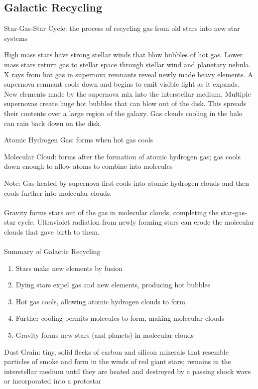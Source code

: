 \documentclass[12pt]{article}
\begin{document}
\subsection{Galactic Recycling}
\begin{definition} Star-Gas-Star Cycle: the process of recycling gas from old stars into new star systems
\end{definition}
High mass stars have strong stellar winds that blow bubbles of hot gas. Lower mass stars return gas to stellar space through stellar wind and planetary nebula. X rays from hot gas in supernova remnants reveal newly made heavy elements. A supernova remnant cools down and begins to emit visible light as it expands. New elements made by the supernova mix into the interstellar medium. Multiple supernovas create huge hot bubbles that can blow out of the disk. This spreads their contents over a large region of the galaxy. Gas clouds cooling in the halo can rain back down on the disk. 
\begin{definition} Atomic Hydrogen Gas: forms when hot gas cools \end{definition}
\begin{definition} Molecular Cloud: forms after the formation of atomic hydrogen gas; gas cools down enough to allow atoms to combine into molecules \end{definition}
Note: Gas heated by supernova first cools into atomic hydrogen clouds and then cools further into molecular clouds. \\~\\
Gravity forms stars out of the gas in molecular clouds, completing the star-gas-star cycle. Ultraviolet radiation from newly forming stars can erode the molecular clouds that gave birth to them. \\~\\
Summary of Galactic Recycling \begin{enumerate} 
\item Stars make new elements by fusion 
\item Dying stars expel gas and new elements, producing hot bubbles 
\item Hot gas cools, allowing atomic hydrogen clouds to form
\item Further cooling permits molecules to form, making molecular clouds 
\item Gravity forms new stars (and planets) in molecular clouds \end{enumerate} 
\begin{definition} Dust Grain: tiny, solid flecks of carbon and silicon minerals that resemble particles of smoke and form in the winds of red giant stars; remains in the interstellar medium until they are heated and destroyed by a passing shock wave or incorporated into a protostar \end{definition}
\end{document}
